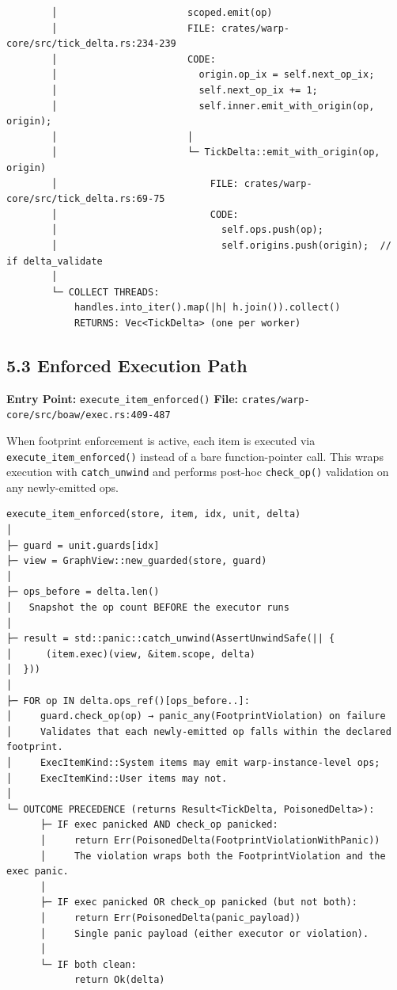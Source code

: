 \documentclass[
]{book}
\begin{document}
\begin{verbatim}
        │                       scoped.emit(op)
        │                       FILE: crates/warp-core/src/tick_delta.rs:234-239
        │                       CODE:
        │                         origin.op_ix = self.next_op_ix;
        │                         self.next_op_ix += 1;
        │                         self.inner.emit_with_origin(op, origin);
        │                       │
        │                       └─ TickDelta::emit_with_origin(op, origin)
        │                           FILE: crates/warp-core/src/tick_delta.rs:69-75
        │                           CODE:
        │                             self.ops.push(op);
        │                             self.origins.push(origin);  // if delta_validate
        │
        └─ COLLECT THREADS:
            handles.into_iter().map(|h| h.join()).collect()
            RETURNS: Vec<TickDelta> (one per worker)
\end{verbatim}

\subsection{5.3 Enforced Execution Path}\label{enforced-execution-path}

\textbf{Entry Point:} \texttt{execute\_item\_enforced()}
\textbf{File:} \texttt{crates/warp-core/src/boaw/exec.rs:409-487}

When footprint enforcement is active, each item is executed via
\texttt{execute\_item\_enforced()} instead of a bare function-pointer call.
This wraps execution with \texttt{catch\_unwind} and performs post-hoc
\texttt{check\_op()} validation on any newly-emitted ops.

\begin{verbatim}
execute_item_enforced(store, item, idx, unit, delta)
│
├─ guard = unit.guards[idx]
├─ view = GraphView::new_guarded(store, guard)
│
├─ ops_before = delta.len()
│   Snapshot the op count BEFORE the executor runs
│
├─ result = std::panic::catch_unwind(AssertUnwindSafe(|| {
│      (item.exec)(view, &item.scope, delta)
│  }))
│
├─ FOR op IN delta.ops_ref()[ops_before..]:
│     guard.check_op(op) → panic_any(FootprintViolation) on failure
│     Validates that each newly-emitted op falls within the declared footprint.
│     ExecItemKind::System items may emit warp-instance-level ops;
│     ExecItemKind::User items may not.
│
└─ OUTCOME PRECEDENCE (returns Result<TickDelta, PoisonedDelta>):
      ├─ IF exec panicked AND check_op panicked:
      │     return Err(PoisonedDelta(FootprintViolationWithPanic))
      │     The violation wraps both the FootprintViolation and the exec panic.
      │
      ├─ IF exec panicked OR check_op panicked (but not both):
      │     return Err(PoisonedDelta(panic_payload))
      │     Single panic payload (either executor or violation).
      │
      └─ IF both clean:
            return Ok(delta)
\end{verbatim}
\end{document}
